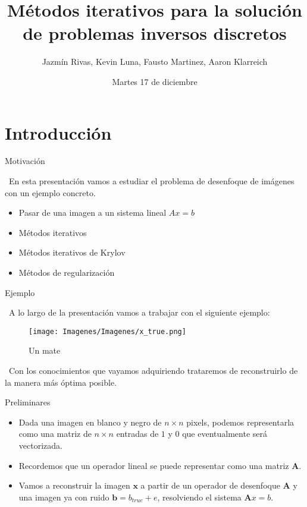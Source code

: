 \documentclass[12pt]{beamer}
\title{Métodos iterativos para la solución de problemas inversos discretos}
\author{Jazmín Rivas, Kevin Luna, Fausto Martinez, Aaron Klarreich}
\date{Martes 17 de diciembre}
\begin{document}
	
	\begin{frame}
		\titlepage
	\end{frame}
	
	\section{Introducción} 
	
	\begin{frame}{Motivación}
		
		\ En esta presentación vamos a estudiar el problema de desenfoque de imágenes con un ejemplo concreto.
		
		\begin{itemize}
			\item Pasar de una imagen a un sistema lineal $Ax = b$
			\item Métodos iterativos
			\item Métodos iterativos de Krylov
			\item Métodos de regularización
		\end{itemize}
		
	\end{frame}
	
	\begin{frame}{Ejemplo}
		
		\ A lo largo de la presentación vamos a trabajar con el siguiente ejemplo:
		\begin{figure}[htp]
			\centering
			\texttt{[image: Imagenes/Imagenes/x\_true.png]}
			\caption{Un mate}
		\end{figure}
		
		\ Con los conocimientos que vayamos adquiriendo trataremos de reconstruirlo de la manera más óptima posible.
		
	\end{frame}
	
	\begin{frame}{Preliminares}
		
		\begin{itemize}
			\item Dada una imagen en blanco y negro de $n \times n$ pixels, podemos representarla como una matriz de $n \times n$ entradas de $1$ y $0$ que eventualmente será vectorizada.
			\item Recordemos que un operador lineal se puede representar como una matriz $\mathbf A$.
			\item Vamos a reconstruir la imagen $\mathbf x$ a partir de un operador de desenfoque $\mathbf A$ y una imagen ya con ruido $\mathbf b = b_{true}+e$, resolviendo el sistema $\mathbf Ax=b$.
		\end{itemize}
		
	\end{frame}
	
\end{document}

